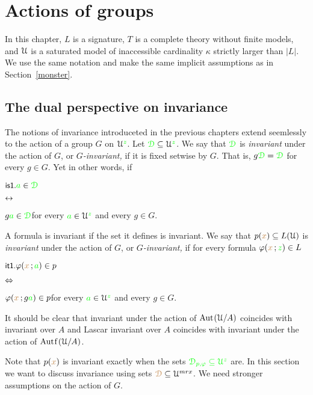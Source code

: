 \chapter{Actions of groups}
\label{actions}

\def\medrel#1{\parbox[t]{5ex}{$\displaystyle\hfil #1$}}
\def\ceq#1#2#3{\parbox[t]{17ex}{$\displaystyle #1$}\medrel{#2}{$\displaystyle #3$}}

In this chapter, $L$ is a signature, $T$ is a complete theory without finite models, and $\EuScript U$ is a saturated model of inaccessible cardinality $\kappa$ strictly larger than $|L|$.
We use the same notation and make the same implicit assumptions as in Section~\ref{monster}.

\section{The dual perspective on invariance}\label{dual_perspective}

The notions of invariance introduceted in the previous chapters extend seemlessly to the action of a group $G$ on $\EuScript U^{\color{green} z}$.
Let ${\color{green}\EuScript D}\subseteq\EuScript U^{\color{green} z}$.
We say that ${\color{green}\EuScript D}$ is \emph{invariant\/} under the action of $G$, or \emph{$G$-invariant,} if it is fixed setwise by $G$.
That is, $g{\color{green}\EuScript D}={\color{green}\EuScript D}$ for every $g\in G$.
Yet in other words, if

\ceq{\ssf{is1.}\hfill {\gr a}\in\grD}{\iff}{g{\gr a}\in\grD}\hfill for every ${\color{green} a}\in\EuScript U^{\color{green} z}$ and every $g\in G$.

A formula is invariant if the set it defines is invariant.
We say that $p({\color{brown} x})\subseteq L(\EuScript U)$ is \emph{invariant\/} under the action of $G$, or \emph{$G$-invariant,} if for every formula $\varphi({\color{brown} x}\,;{\color{green} z})\in L$ 

\ceq{\ssf{it1.}\hfill\phi({\mr x}\,;{\gr a})\in p}{\IFF}{\phi({\mr x}\,;g{\gr a})\in p}\hfill for every ${\color{green} a}\in\EuScript U^{\color{green} z}$ and every $g\in G$.

It should be clear that invariant under the action of ${\rm Aut\kern.15ex}(\EuScript U/A)$ coincides with invariant over $A$ and Lascar invariant over $A$ coincides with invariant under the action of $\mathord{\rm Aut\kern.15ex{f}\kern.15ex}(\EuScript U/A)$.

Note that $p({\color{brown} x})$ is invariant exactly when the sets $\color{green}\EuScript D_{p,\varphi}\subseteq\EuScript U^{\color{green} z}$ are.
In this section we want to discuss invariance using sets ${\color{brown}\EuScript D}\subseteq\EuScript U^{mr x}$.
We need stronger assumptions on the action of $G$.

